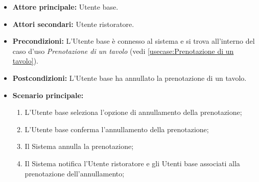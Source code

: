 \label{usecase:Annullamento della prenotazione}
\begin{itemize}
	\item \textbf{Attore principale:} Utente base.

	\item \textbf{Attori secondari:} Utente ristoratore.

	\item \textbf{Precondizioni:}
	      L'Utente base è connesso al sistema e si trova all'interno del caso
	      d'uso \textit{Prenotazione di un tavolo} (vedi
	      \autoref{usecase:Prenotazione di un tavolo}).

	\item \textbf{Postcondizioni:}
	      L'Utente base ha annullato la prenotazione di un tavolo.

	\item \textbf{Scenario principale:}
	      \begin{enumerate}
		      \item L'Utente base seleziona l'opzione di annullamento
		            della prenotazione;

		      \item L'Utente base conferma l'annullamento della prenotazione;
		      
		      \item Il Sistema annulla la prenotazione;

		      \item Il Sistema notifica l'Utente ristoratore e gli Utenti base
		            associati alla prenotazione dell'annullamento;
	      \end{enumerate}
\end{itemize}
